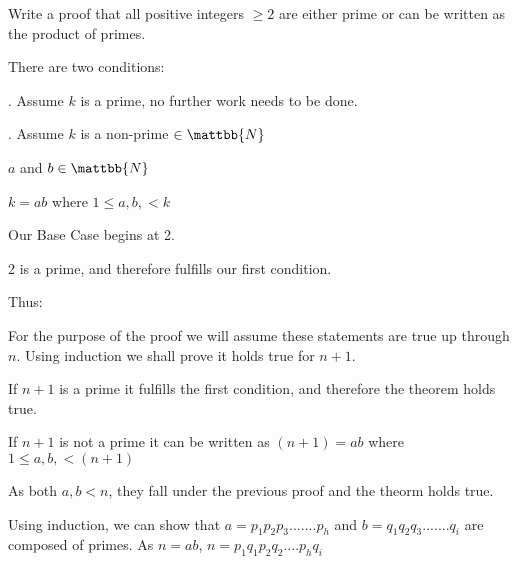 \documentclass[12pt]{article}
\begin{document}
Write a proof that all positive integers $\ge 2$ are either prime or can be written as the product of primes.\vspace{0.5in}

There are two conditions:

. Assume $k$ is a prime, no further work needs to be done.

. Assume $k$ is a non-prime $\in \mattbb{N}$

$a$ and $b \in \mattbb{N}$

$k = ab$ where $1 \leq a, b, < k$\vspace{0.2in}


Our Base Case begins at 2.

2 is a prime, and therefore fulfills our first condition.\vspace{0.2in}

Thus:

For the purpose of the proof we will assume these statements are true up through $n$. Using induction we shall prove it holds true for $n+1$.

If $n+1$ is a prime it fulfills the first condition, and therefore the theorem holds true.

If $n+1$ is not a prime it can be written as $(n+1) = ab$ where $1 \leq a, b, < (n+1)$

As both $a, b < n$, they fall under the previous proof and the theorm holds true.

Using induction, we can show that
$a = p_1p_2p_3.......p_h$
and
$b = q_1q_2q_3.......q_i$ are composed of primes. As $n = ab$,  $n = p_1q_1p_2q_2....p_hq_i$\vspace{0.5in}
\end{document}
